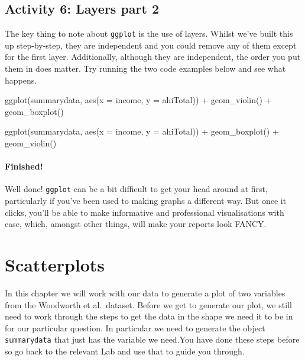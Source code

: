 \documentclass[
  oneside]{book}
\newenvironment{Shaded}{\begin{snugshade}}{\end{snugshade}}
\newcommand{\AttributeTok}[1]{\textcolor[rgb]{0.77,0.63,0.00}{#1}}
\newcommand{\FunctionTok}[1]{\textcolor[rgb]{0.00,0.00,0.00}{#1}}
\newcommand{\NormalTok}[1]{#1}
\newcommand{\SpecialCharTok}[1]{\textcolor[rgb]{0.00,0.00,0.00}{#1}}
\begin{document}
\hypertarget{activity-6-layers-part-2}{%
\section{Activity 6: Layers part 2}\label{activity-6-layers-part-2}}

The key thing to note about \texttt{ggplot} is the use of layers. Whilst we've built this up step-by-step, they are independent and you could remove any of them except for the first layer. Additionally, although they are independent, the order you put them in does matter. Try running the two code examples below and see what happens.

\begin{Shaded}
\begin{Highlighting}[]
\FunctionTok{ggplot}\NormalTok{(summarydata, }\FunctionTok{aes}\NormalTok{(}\AttributeTok{x =}\NormalTok{ income, }\AttributeTok{y =}\NormalTok{ ahiTotal)) }\SpecialCharTok{+}
  \FunctionTok{geom\_violin}\NormalTok{() }\SpecialCharTok{+}
  \FunctionTok{geom\_boxplot}\NormalTok{()}

\FunctionTok{ggplot}\NormalTok{(summarydata, }\FunctionTok{aes}\NormalTok{(}\AttributeTok{x =}\NormalTok{ income, }\AttributeTok{y =}\NormalTok{ ahiTotal)) }\SpecialCharTok{+}
  \FunctionTok{geom\_boxplot}\NormalTok{() }\SpecialCharTok{+}
  \FunctionTok{geom\_violin}\NormalTok{()}
\end{Highlighting}
\end{Shaded}

\hypertarget{finished-4}{%
\subsubsection{Finished!}\label{finished-4}}

Well done! \texttt{ggplot} can be a bit difficult to get your head around at first, particularly if you've been used to making graphs a different way. But once it clicks, you'll be able to make informative and professional visualisations with ease, which, amongst other things, will make your reports look FANCY.

\hypertarget{scatterplots}{%
\chapter{Scatterplots}\label{scatterplots}}

In this chapter we will work with our data to generate a plot of two variables from the Woodworth et al.~dataset. Before we get to generate our plot, we still need to work through the steps to get the data in the shape we need it to be in for our particular question. In particular we need to generate the object \texttt{summarydata} that just has the variable we need.You have done these steps before so go back to the relevant Lab and use that to guide you through.
\end{document}
